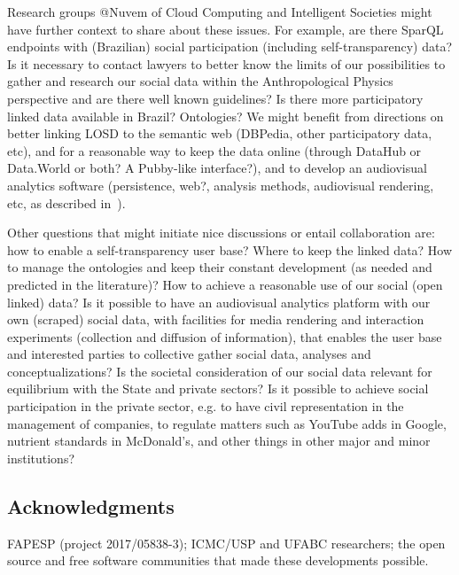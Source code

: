 \documentclass[letterpaper,10pt]{article}
\begin{document}
Research groups @Nuvem of Cloud Computing and Intelligent Societies might have 
further context to share about these issues.
For example, are there SparQL endpoints with (Brazilian) social participation
(including self-transparency) data?
Is it necessary to contact lawyers to
better know the limits of our possibilities
to gather and research our social data within
the Anthropological Physics perspective
and are there well known guidelines?
Is there more participatory linked data available
in Brazil? Ontologies?
We might benefit from directions 
on better linking LOSD to the semantic web
(DBPedia, other participatory data, etc),
and for a reasonable way to keep the data online
(through DataHub or Data.World or both?
A Pubby-like interface?),
and to develop an audiovisual analytics
software
(persistence, web?, analysis methods, audiovisual rendering, etc,
as described in~\cite{nuvem2}).

Other questions that might initiate
nice discussions or entail collaboration are:
how to enable a self-transparency user base?
Where to keep the linked data?
How to manage the ontologies and keep their
constant development (as needed and predicted in the literature)?
How to achieve a reasonable 
use of our social (open linked) data?
Is it possible to have an audiovisual analytics
platform with our own (scraped) social data,
with facilities for media rendering and
interaction experiments (collection and diffusion of information),
that enables the user base and interested parties to
collective gather social data, analyses and conceptualizations?
Is the societal consideration of our social data
relevant for equilibrium with the State and private sectors?
Is it possible to achieve social participation in the private sector,
e.g. to have civil representation in the management of companies,
to regulate matters such as YouTube adds in Google,
nutrient standards in McDonald's,
and other things in other major and minor institutions?

\subsection{Acknowledgments}
FAPESP (project 2017/05838-3); ICMC/USP and UFABC researchers;
the open source and free software communities that
made these developments possible. 
\end{document}
